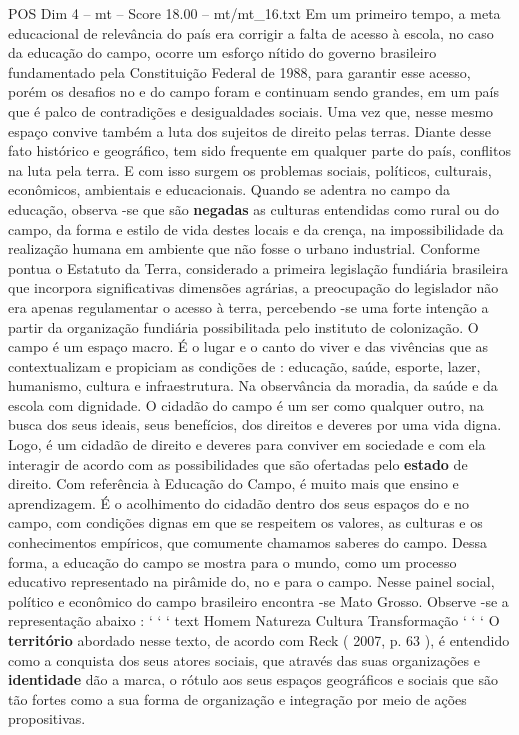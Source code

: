 \begin{textsample}{POS Dim 4 – mt – Score 18.00 – mt/mt\_16.txt}
Em um primeiro tempo, a meta educacional de relevância do país era corrigir a falta de acesso à escola, no caso da educação do campo, ocorre um esforço nítido do governo brasileiro fundamentado pela Constituição Federal de 1988, para garantir esse acesso, porém os desafios no e do campo foram e continuam sendo grandes, em um país que é palco de contradições e desigualdades sociais.
Uma vez que, nesse mesmo espaço convive também a luta dos sujeitos de direito pelas terras.
Diante desse fato histórico e geográfico, tem sido frequente em qualquer parte do país, conflitos na luta pela terra.
E com isso surgem os problemas sociais, políticos, culturais, econômicos, ambientais e educacionais.
Quando se adentra no campo da educação, observa -se que são \textbf{negadas} as culturas entendidas como rural ou do campo, da forma e estilo de vida destes locais e da crença, na impossibilidade da realização humana em ambiente que não fosse o urbano industrial.
Conforme pontua o Estatuto da Terra, considerado a primeira legislação fundiária brasileira que incorpora significativas dimensões agrárias, a preocupação do legislador não era apenas regulamentar o acesso à terra, percebendo -se uma forte intenção a partir da organização fundiária possibilitada pelo instituto de colonização.
O campo é um espaço macro.
É o lugar e o canto do viver e das vivências que as contextualizam e propiciam as condições de : educação, saúde, esporte, lazer, humanismo, cultura e infraestrutura.
Na observância da moradia, da saúde e da escola com dignidade.
O cidadão do campo é um ser como qualquer outro, na busca dos seus ideais, seus benefícios, dos direitos e deveres por uma vida digna.
Logo, é um cidadão de direito e deveres para conviver em sociedade e com ela interagir de acordo com as possibilidades que são ofertadas pelo \textbf{estado} de direito.
Com referência à Educação do Campo, é muito mais que ensino e aprendizagem.
É o acolhimento do cidadão dentro dos seus espaços do e no campo, com condições dignas em que se respeitem os valores, as culturas e os conhecimentos empíricos, que comumente chamamos saberes do campo.
Dessa forma, a educação do campo se mostra para o mundo, como um processo educativo representado na pirâmide do, no e para o campo.
Nesse painel social, político e econômico do campo brasileiro encontra -se Mato Grosso.
Observe -se a representação abaixo : ` ` ` text Homem Natureza Cultura Transformação ` ` ` O \textbf{território} abordado nesse texto, de acordo com Reck ( 2007, p. 63 ), é entendido como a conquista dos seus atores sociais, que através das suas organizações e \textbf{identidade} dão a marca, o rótulo aos seus espaços geográficos e sociais que são tão fortes como a sua forma de organização e integração por meio de ações propositivas.

\end{textsample}
